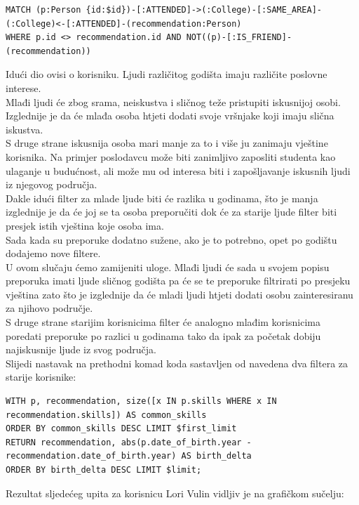 \documentclass[titlepage, 12pt]{scrartcl}
\begin{document}
\begin{samepage}
\begin{verbatim}
MATCH (p:Person {id:$id})-[:ATTENDED]->(:College)-[:SAME_AREA]-
(:College)<-[:ATTENDED]-(recommendation:Person)
WHERE p.id <> recommendation.id AND NOT((p)-[:IS_FRIEND]-(recommendation))

\end{verbatim}
\end{samepage}
Idući dio ovisi o korisniku. Ljudi različitog godišta imaju različite poslovne interese. \\
Mlađi ljudi će zbog srama, neiskustva i sličnog teže pristupiti  iskusnijoj osobi. Izglednije je da će mlađa osoba htjeti dodati svoje vršnjake koji imaju slična iskustva. \\
S druge strane iskusnija osoba mari manje za to i više ju zanimaju vještine korisnika. Na primjer poslodavcu može biti zanimljivo zaposliti studenta kao ulaganje u budućnost, ali može mu od interesa biti i zapošljavanje iskusnih ljudi iz njegovog područja. \\
Dakle idući filter za mlade ljude biti će razlika u godinama, što je manja izglednije je da će joj se ta osoba preporučiti dok će za starije ljude filter biti presjek istih vještina koje osoba ima. \\
Sada kada su preporuke dodatno sužene, ako je to potrebno, opet po godištu dodajemo nove filtere. \\
U ovom slučaju ćemo zamijeniti uloge. Mlađi ljudi će sada u svojem popisu preporuka imati ljude sličnog godišta pa će se te preporuke filtrirati po presjeku vještina zato što je izglednije da će mladi ljudi htjeti dodati osobu zainteresiranu za njihovo područje. \\
S druge strane starijim korisnicima filter će analogno mlađim korisnicima poredati preporuke po razlici u godinama tako da ipak za početak dobiju najiskusnije ljude iz svog područja. \\
Slijedi nastavak na prethodni komad koda sastavljen od navedena dva filtera za starije korisnike:
\begin{samepage}
\begin{verbatim}
WITH p, recommendation, size([x IN p.skills WHERE x IN recommendation.skills]) AS common_skills 
ORDER BY common_skills DESC LIMIT $first_limit
RETURN recommendation, abs(p.date_of_birth.year - recommendation.date_of_birth.year) AS birth_delta 
ORDER BY birth_delta DESC LIMIT $limit;

\end{verbatim}
\end{samepage}
\newpage
Rezultat sljedećeg upita za korisnicu Lori Vulin vidljiv je na grafičkom sučelju:
\end{document}
